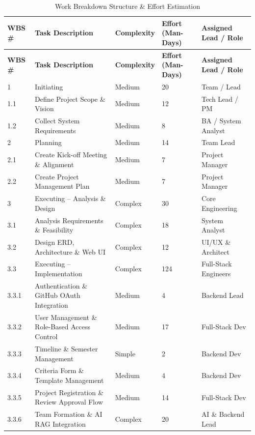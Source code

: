 \begin{footnotesize}
\begin{longtable}{|p{1.1cm}|p{4cm}|p{1.6cm}|p{1.4cm}|p{2.6cm}|}
\caption{Work Breakdown Structure \& Effort Estimation}\label{tab:wbs}\\
\hline
\hline
\textbf{WBS \#} & \textbf{Task Description} & \textbf{Complexity} & \textbf{Effort (Man-Days)} & \textbf{Assigned Lead / Role} \\
\hline
\hline
\endfirsthead
\hline
\textbf{WBS \#} & \textbf{Task Description} & \textbf{Complexity} & \textbf{Effort (Man-Days)} & \textbf{Assigned Lead / Role} \\
\hline
\hline
\endhead
1 & Initiating & Medium & 20 & Team / Lead \\
\hline
1.1 & Define Project Scope \& Vision & Medium & 12 & Tech Lead / PM \\
\hline
1.2 & Collect System Requirements & Medium & 8 & BA / System Analyst \\
\hline
2 & Planning & Medium & 14 & Team Lead \\
\hline
2.1 & Create Kick-off Meeting \& Alignment & Medium & 7 & Project Manager \\
\hline
2.2 & Create Project Management Plan & Medium & 7 & Project Manager \\
\hline
3 & Executing -- Analysis \& Design & Complex & 30 & Core Engineering \\
\hline
3.1 & Analysis Requirements \& Feasibility & Complex & 18 & System Analyst \\
\hline
3.2 & Design ERD, Architecture \& Web UI & Complex & 12 & UI/UX \& Architect \\
\hline
3.3 & Executing -- Implementation & Complex & 124 & Full-Stack Engineers \\
\hline
3.3.1 & Authentication \& GitHub OAuth Integration & Medium & 4 & Backend Lead \\
\hline
3.3.2 & User Management \& Role-Based Access Control & Medium & 17 & Full-Stack Dev \\
\hline
3.3.3 & Timeline \& Semester Management & Simple & 2 & Backend Dev \\
\hline
3.3.4 & Criteria Form \& Template Management & Medium & 4 & Backend Dev \\
\hline
3.3.5 & Project Registration \& Review Approval Flow & Medium & 14 & Full-Stack Dev \\
\hline
3.3.6 & Team Formation \& AI RAG Integration & Complex & 20 & AI \& Backend Lead \\

\end{longtable}
\end{footnotesize}
